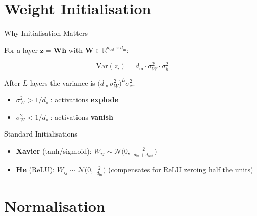 \documentclass[aspectratio=169, professionalfonts]{beamer}
\def\R{\mathbb{R}}
\begin{document}
\section{Weight Initialisation}

\begin{frame}{Why Initialisation Matters}

For a layer $\mathbf{z} = \mathbf{W}\mathbf{h}$ with
$\mathbf{W} \in \R^{d_\text{out}\times d_\text{in}}$:

$$\text{Var}(z_i) = d_\text{in}\cdot\sigma_W^2\cdot\sigma_h^2$$

After $L$ layers the variance is
$\bigl(d_\text{in}\,\sigma_W^2\bigr)^L \sigma_x^2$.

\bigskip

\begin{itemize}
  \item $\sigma_W^2 > 1/d_\text{in}$: activations \textbf{explode}
  \item $\sigma_W^2 < 1/d_\text{in}$: activations \textbf{vanish}
\end{itemize}

\bigskip

\begin{block}{Standard Initialisations}
\begin{itemize}
  \item \textbf{Xavier} (tanh/sigmoid):
    $W_{ij} \sim \mathcal{N}\!\bigl(0,\;
      \frac{2}{d_\text{in}+d_\text{out}}\bigr)$
  \item \textbf{He} (ReLU):
    $W_{ij} \sim \mathcal{N}\!\bigl(0,\;
      \frac{2}{d_\text{in}}\bigr)$
    \quad (compensates for ReLU zeroing half the units)
\end{itemize}
\end{block}

\end{frame}

\section{Normalisation}
\end{document}
